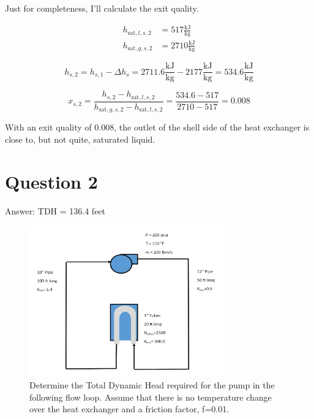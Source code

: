 \documentclass{article}
\begin{document}
Just for completeness, I'll calculate the exit quality.

\begin{align*}
    h_{\text{sat},l,s,2} &= 517 \frac{\text{kJ}}{\text{kg}} \\
    h_{\text{sat},g,s,2} &= 2710 \frac{\text{kJ}}{\text{kg}}
\end{align*}

\begin{equation}
    h_{s,2} = h_{s,1} - \Delta h_s = 2711.6 \frac{\text{kJ}}{\text{kg}} - 2177 \frac{\text{kJ}}{\text{kg}} = 534.6 \frac{\text{kJ}}{\text{kg}}
\end{equation}

\begin{equation}
    x_{s,2} = \frac{h_{s,2} - h_{\text{sat},l,s,2}}{h_{\text{sat},g,s,2} - h_{\text{sat},l,s,2}} = \frac{534.6 - 517}{2710 - 517} = 0.008
\end{equation}

With an exit quality of 0.008, the outlet of the shell side of the heat exchanger is close to, but not quite, saturated liquid.

\newpage

\section{Question 2}

Answer: TDH = 136.4 feet

\begin{figure}[htbp]
    \centering
    \includegraphics[width=0.75\textwidth]{question_2_picture.png}
    \caption{Determine the Total Dynamic Head required for the pump in the following flow loop. Assume that there is no temperature change over the heat exchanger and a friction factor, f=0.01.}
    \label{fig:question_2_fig}
\end{figure}
\end{document}

